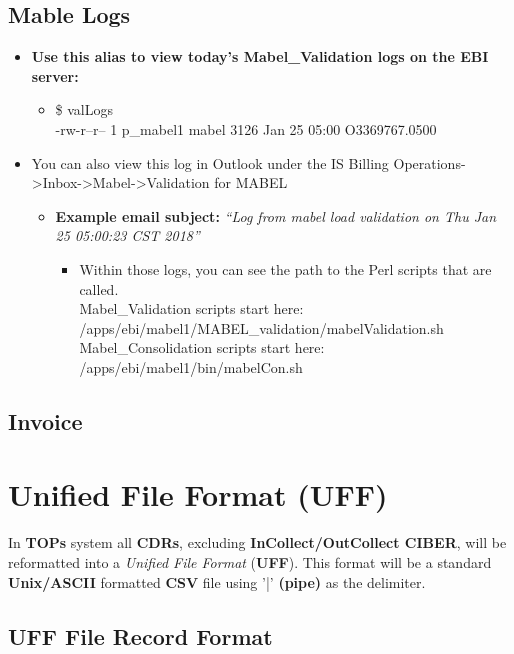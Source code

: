 \documentclass[12pt,twoside]{article}
\begin{document}
\subsection{Mable Logs}
\label{sec:orgheadline48}
\begin{itemize}
\item \textbf{Use this alias to view today’s Mabel\_Validation logs on the EBI server:}
\begin{itemize}
\item{}\$ valLogs\\
-rw-r--r-- 1 p\_mabel1 mabel 3126 Jan 25 05:00 O3369767.0500
\end{itemize}
\item You can also view this log in Outlook under the IS Billing Operations->Inbox->Mabel->Validation for MABEL
\begin{itemize}
\item \textbf{Example email subject:} \emph{“Log from mabel load validation on Thu Jan 25 05:00:23 CST 2018”}
\begin{itemize}
\item Within those logs, you can see the path to the Perl scripts that are called. \\
Mabel\_Validation scripts start here:\\
 /apps/ebi/mabel1/MABEL\_validation/mabelValidation.sh\\
Mabel\_Consolidation scripts start here:\\
 /apps/ebi/mabel1/bin/mabelCon.sh
\end{itemize}
\end{itemize}
\end{itemize}
\subsection{Invoice}
\label{sec:orgheadline49}

\section{Unified File Format (UFF)}
\label{sec:orgheadline56}
In \textbf{TOPs} system all \textbf{CDRs}, excluding \textbf{InCollect/OutCollect CIBER},
will be reformatted into a \emph{Unified File Format} (\textbf{UFF}). This format
will be a standard \textbf{Unix/ASCII} formatted \textbf{CSV} file using '|'
\textbf{(pipe)} as the delimiter.
\subsection{UFF File Record Format}
\label{sec:orgheadline51}
\footnotesize
\end{document}
